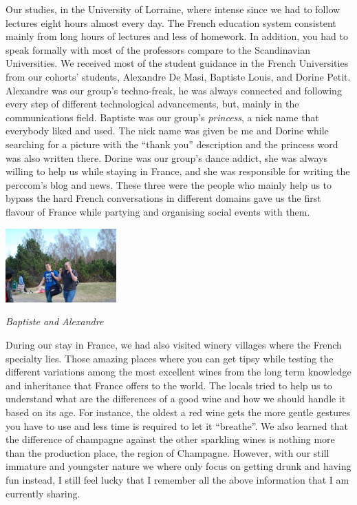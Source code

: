 \documentclass[10pt,a4paper]{article} %
\begin{document}
\begin{multicols}{3}
Our studies, in the University of Lorraine, where intense since we had to 
follow lectures eight hours almost every day. 
The French education system consistent mainly from long hours of lectures and less 
of homework. 
In addition, you had to speak formally with most of the professors compare to the 
Scandinavian Universities. 
We received most of the student guidance in the French Universities from our 
cohorts' students, Alexandre De Masi, Baptiste Louis, and Dorine Petit. 
Alexandre was our group's techno-freak, he was always connected and following 
every step of different technological advancements, but, mainly in the communications 
field. 
Baptiste was our group's \textit{princess}, a nick name that everybody liked and used. 
The nick name was given be me and Dorine while searching for a picture with the ``thank 
you'' description and the princess word was also written there. 
Dorine was our group's dance addict, she was always willing to help us while 
staying in France, and she was responsible for writing the {\sc perccom}'s blog and 
news.
These three were the people who mainly help us to bypass the hard French conversations 
in different domains gave us the first flavour of France while partying and organising 
social events with them. 


\begin{center}
	\includegraphics[width=0.32\textwidth]{media/baptiste_alex.jpg}
	\par\textit{Baptiste and Alexandre}
\end{center} 


During our stay in France, we had also visited winery villages where the French 
specialty lies. 
Those amazing places where you can get tipsy while testing the different variations 
among the most excellent wines from the long term knowledge and inheritance that 
France offers to the world. 
The locals tried to help us to understand what are the differences of a good wine 
and how we should handle it based on its age. 
For instance, the oldest a red wine gets the more gentle gestures you have to use and 
less time is required to let it ``breathe''. 
We also learned that the difference of champagne against the other sparkling wines 
is nothing more than the production place, the region of Champagne. 
However, with our still immature and youngster nature we where only focus on getting 
drunk and having fun instead, I still feel lucky that I remember all the above 
information that I am currently sharing. 



\end{multicols}
\end{document}
